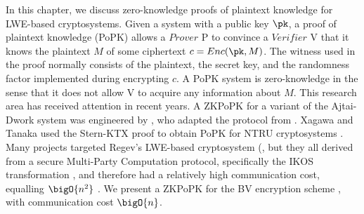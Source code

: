 In this chapter, we discuss zero-knowledge proofs of plaintext knowledge for 
LWE-based cryptosystems. Given a system with a public key $\pk$, a proof of 
plaintext knowledge (PoPK) allows a $Prover$ P to convince a $Verifier$ V that 
it knows the plaintext $M$ of some ciphertext $c = Enc(\pk, M)$. The witness 
used in the proof normally consists of the plaintext, the secret key, and the 
randomness factor implemented during encrypting $c$. A PoPK system is zero-knowledge in the 
sense that it does not allow V to acquire any information about $M$. This research
area has received attention in recent years. A ZKPoPK for a variant of the Ajtai-Dwork
system \cite{ajtai1997public} was engineered by \cite{goldreich1999approximating}, who 
adapted the protocol from \cite{micciancio2003statistical}. Xagawa and Tanaka 
\cite{xagawa2009zero} used the Stern-KTX proof \cite{stern1993new, kawachi2008concurrently}
to obtain PoPK for NTRU cryptosystems \cite{hoffstein1998ntru}. Many projects targeted 
Regev's LWE-based cryptosystem (\cite{bendlin2010threshold, bendlin2011semi, asharov2012multiparty},
but they all derived from a secure Multi-Party Computation protocol, specifically the IKOS
transformation \cite{ishai2007zero}, and therefore had a relatively high communication cost, equalling $\bigO{n^2}$ . We present a ZKPoPK for the BV encryption scheme \cite{brakerski2011fully}, with communication cost $\bigO{n}$.







